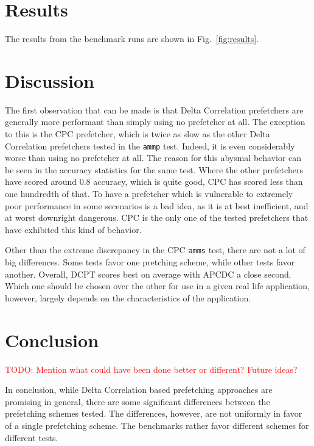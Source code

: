 \documentclass[a4paper]{IEEEtran}
\newcommand\TODO[1]{\textcolor{red}{TODO:#1}}
\newcommand\todo[1]{\TODO{#1}}
\begin{document}
\section{Results}

The results from the benchmark runs are shown in Fig.~\ref{fig:results}.

\section{Discussion}

The first observation that can be made is that Delta Correlation prefetchers are generally more performant than simply using no prefetcher at all.
The exception to this is the CPC prefetcher, which is twice as slow as the other Delta Correlation prefetchers tested in the \texttt{ammp} test.
Indeed, it is even considerably worse than using no prefetcher at all.
The reason for this abysmal behavior can be seen in the accuracy statistics for the same test.
Where the other prefetchers have scored around 0.8 accuracy, which is quite good, CPC has scored less than one hundredth of that.
To have a prefetcher which is vulnerable to extremely poor performance in some secenarios is a bad idea, as it is at best inefficient, and at worst downright dangerous.
CPC is the only one of the tested prefetchers that have exhibited this kind of behavior.

Other than the extreme discrepancy in the CPC \texttt{amms} test, there are not a lot of big differences.
Some tests favor one pretching scheme, while other tests favor another.
Overall, DCPT scores best on average with APCDC a close second.
Which one should be chosen over the other for use in a given real life application, however, largely depends on the characteristics of the application.



\section{Conclusion}

\todo{ Mention what could have been done better or different? Future ideas? }

In conclusion, while Delta Correlation based prefetching approaches are promising in general, there are some significant differences between the prefetching schemes tested.
The differences, however, are not uniformly in favor of a single prefetching scheme.
The benchmarks rather favor different schemes for different tests.
\end{document}
